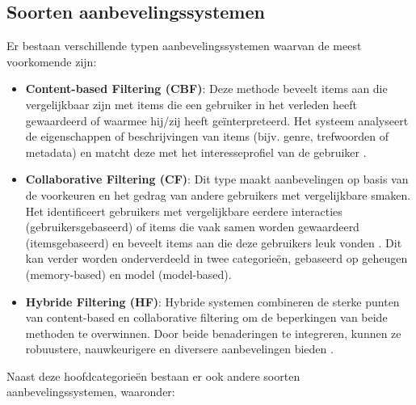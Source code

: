 \subsection{Soorten aanbevelingssystemen}
Er bestaan verschillende typen aanbevelingssystemen waarvan de meest voorkomende zijn:
\begin{itemize}
  \item \textbf{Content-based Filtering (CBF)}: Deze methode beveelt items aan die vergelijkbaar zijn met items die een gebruiker in het verleden heeft gewaardeerd of waarmee hij/zij heeft geïnterpreteerd. Het systeem analyseert de eigenschappen of beschrijvingen van items (bijv. genre, trefwoorden of metadata) en matcht deze met het interesseprofiel van de gebruiker \autocite{Patel2023}.
  \item \textbf{Collaborative Filtering (CF)}: Dit type maakt aanbevelingen op basis van de voorkeuren en het gedrag van andere gebruikers met vergelijkbare smaken. Het identificeert gebruikers met vergelijkbare eerdere interacties (gebruikersgebaseerd) of items die vaak samen worden gewaardeerd (itemsgebaseerd) en beveelt items aan die deze gebruikers leuk vonden \autocite{Patel2023}. Dit kan verder worden onderverdeeld in twee categorieën, gebaseerd op geheugen (memory-based) en model (model-based).
  \item \textbf{Hybride Filtering (HF)}: Hybride systemen combineren de sterke punten van content-based en collaborative filtering om de beperkingen van beide methoden te overwinnen. Door beide benaderingen te integreren, kunnen ze robuustere, nauwkeurigere en diversere aanbevelingen bieden \autocite{Patel2023}.
\end{itemize}
Naast deze hoofdcategorieën bestaan er ook andere soorten aanbevelingssystemen, waaronder:
